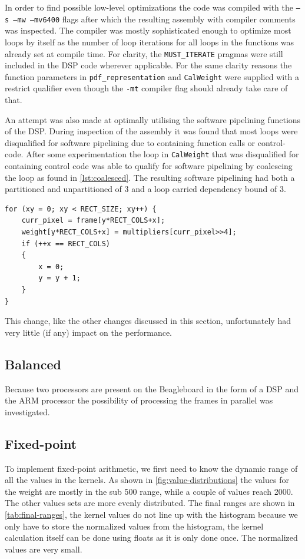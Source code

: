 \documentclass[final]{article}
\begin{document}
In order to find possible low-level optimizations the code was compiled with the \texttt{–s –mw –mv6400} flags after which the resulting assembly with compiler comments was inspected. The compiler was mostly sophisticated enough to optimize most loops by itself as the number of loop iterations for all loops in the functions was already set at compile time. For clarity, the \texttt{MUST\_ITERATE} pragmas were still included in the DSP code wherever applicable. For the same clarity reasons the function parameters in \texttt{pdf\_representation} and \texttt{CalWeight} were supplied with a restrict qualifier even though the \texttt{-mt} compiler flag should already take care of that.

An attempt was also made at optimally utilising the software pipelining functions of the DSP.
During inspection of the assembly it was found that most loops were disqualified for software pipelining due to containing function calls or control-code.
After some experimentation the loop in \texttt{CalWeight} that was disqualified for containing control code was able to qualify for software pipelining by coalescing the loop as found in \cref{lst:coalesced}.
The resulting software pipelining had both a partitioned and unpartitioned of 3 and a loop carried dependency bound of 3.

\begin{lstlisting}[style=c, caption=Coalesced loop for weight calculation, label=lst:coalesced]
for (xy = 0; xy < RECT_SIZE; xy++) {
    curr_pixel = frame[y*RECT_COLS+x];
    weight[y*RECT_COLS+x] = multipliers[curr_pixel>>4];
    if (++x == RECT_COLS)
    {
        x = 0;
        y = y + 1;
    }
}
\end{lstlisting}

This change, like the other changes discussed in this section, unfortunately had very little (if any) impact on the performance.

\subsection{Balanced}
Because two processors are present on the Beagleboard in the form of a DSP and the ARM processor the possibility of processing the frames in parallel was investigated.

\subsection{Fixed-point}
To implement fixed-point arithmetic, we first need to know the dynamic range of all the values in the kernels.
As shown in \cref{fig:value-distributions} the values for the weight are mostly in the sub \num{500} range, while a couple of values reach \num{2000}.
The other values sets are more evenly distributed.
The final ranges are shown in \cref{tab:final-ranges}, the kernel values do not line up with the histogram because we only have to store the normalized values from the histogram, the kernel calculation itself can be done using floats as it is only done once.
The normalized values are very small.
\end{document}
